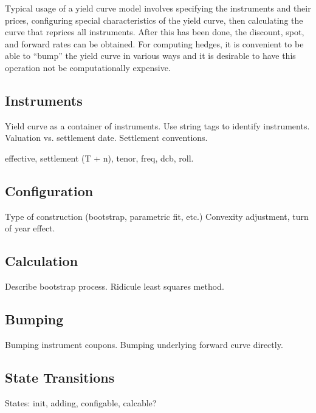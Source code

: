\documentclass[12pt]{amsart}
\begin{document}
Typical usage of a yield curve model involves specifying the instruments
and their prices, configuring special characteristics of the yield
curve, then calculating the curve that reprices all instruments.
After this has been done, the discount, spot, and forward rates 
can be obtained. For computing hedges, it is convenient to be able
to ``bump'' the yield curve in various ways and it is desirable
to have this operation not be computationally expensive.

\subsection{Instruments}

Yield curve as a container of instruments. Use string tags to identify
instruments. Valuation vs. settlement date. Settlement conventions.

effective, settlement (T + n), tenor, freq, dcb, roll.

\subsection{Configuration}

Type of construction (bootstrap, parametric fit, etc.)
Convexity adjustment, turn of year effect.

\subsection{Calculation}

Describe bootstrap process. Ridicule least squares method.

\subsection{Bumping}

Bumping instrument coupons. Bumping underlying forward curve directly.

\subsection{State Transitions}

States: init, adding, configable, calcable?
\end{document}
